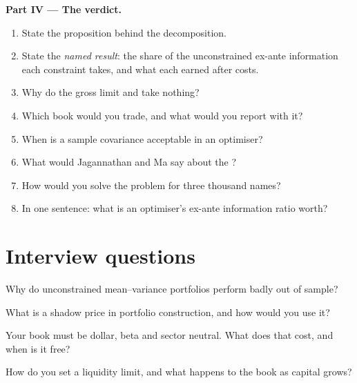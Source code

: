 \begin{problem}
\medskip\noindent\textbf{Part IV --- The verdict.}
\begin{enumerate}[resume]
\item State the proposition behind the decomposition.
\item State the \emph{named result}: the share of the unconstrained ex-ante information each constraint takes, and what each earned after costs.
\item Why do the gross limit and  take nothing?
\item Which book would you trade, and what would you report with it?
\item When is a sample covariance acceptable in an optimiser?
\item What would Jagannathan and Ma say about the ?
\item How would you solve the problem for three thousand names?
\item In one sentence: what is an optimiser's ex-ante information ratio worth?
\end{enumerate}
\end{problem}

\section{Interview questions}

\begin{interviewq}\label{iq:rs:portfolio-construction-i:1}
Why do unconstrained mean--variance portfolios perform badly out of sample?
\end{interviewq}

\begin{interviewq}\label{iq:rs:portfolio-construction-i:2}
What is a shadow price in portfolio construction, and how would you use it?
\end{interviewq}

\begin{interviewq}\label{iq:rs:portfolio-construction-i:3}
Your book must be dollar, beta and sector neutral. What does that cost, and when is it free?
\end{interviewq}

\begin{interviewq}\label{iq:rs:portfolio-construction-i:4}
How do you set a liquidity limit, and what happens to the book as capital grows?
\end{interviewq}

